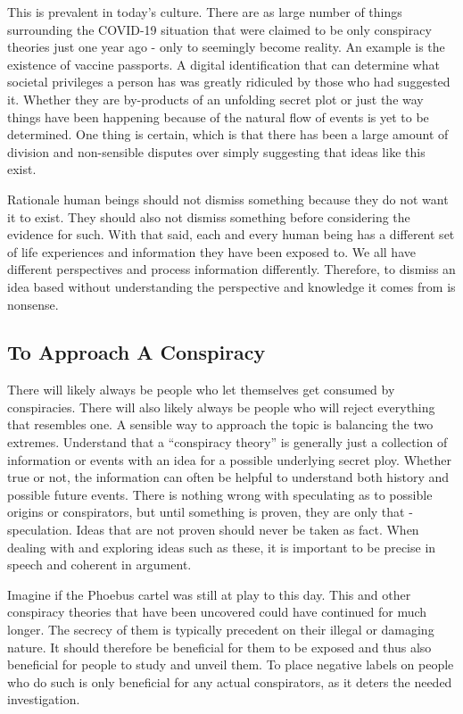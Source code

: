 \documentclass[10pt, a4paper, twocolumn]{book}
\begin{document}
This is prevalent in today's culture. There are as large number of things surrounding the COVID-19 situation that were claimed to be only conspiracy theories just one year ago - only to seemingly become reality. An example is the existence of vaccine passports. A digital identification that can determine what societal privileges a person has was greatly ridiculed by those who had suggested it. Whether they are by-products of an unfolding secret plot or just the way things have been happening because of the natural flow of events is yet to be determined. One thing is certain, which is that there has been a large amount of division and non-sensible disputes over simply suggesting that ideas like this exist. 

Rationale human beings should not dismiss something because they do not want it to exist. They should also not dismiss something before considering the evidence for such. With that said, each and every human being has a different set of life experiences and information they have been exposed to. We all have different perspectives and process information differently. Therefore, to dismiss an idea based without understanding the perspective and knowledge it comes from is nonsense. 

\subsection{To Approach A Conspiracy}

There will likely always be people who let themselves get consumed by conspiracies. There will also likely always be people who will reject everything that resembles one. A sensible way to approach the topic is balancing the two extremes. Understand that a ``conspiracy theory'' is generally just a collection of information or events with an idea for a possible underlying secret ploy. Whether true or not, the information can often be helpful to understand both history and possible future events. There is nothing wrong with speculating as to possible origins or conspirators, but until something is proven, they are only that - speculation. Ideas that are not proven should never be taken as fact. When dealing with and exploring ideas such as these, it is important to be precise in speech and coherent in argument. 

Imagine if the Phoebus cartel was still at play to this day. This and other conspiracy theories that have been uncovered could have continued for much longer. The secrecy of them is typically precedent on their illegal or damaging nature. It should therefore be beneficial for them to be exposed and thus also beneficial for people to study and unveil them. To place negative labels on people who do such is only beneficial for any actual conspirators, as it deters the needed investigation. 
\end{document}
